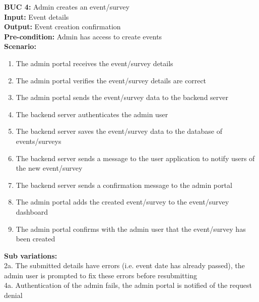 \documentclass[12pt]{article}
\begin{document}
\noindent\textbf{BUC 4: } Admin creates an event/survey \\
\textbf{Input:} Event details \\
\textbf{Output:} Event creation confirmation \\
\textbf{Pre-condition:} Admin has access to create events \\
\textbf{Scenario:} \\
\begin{enumerate}
  \item The admin portal receives the event/survey details
  \item The admin portal verifies the event/survey details are correct
  \item The admin portal sends the event/survey data to the backend server
  \item The backend server authenticates the admin user
  \item The backend server saves the event/survey data to the database of events/surveys
  \item The backend server sends a message to the user application to notify users of the new event/survey
  \item The backend server sends a confirmation message to the admin portal
  \item The admin portal adds the created event/survey to the event/survey dashboard
  \item The admin portal confirms with the admin user that the event/survey has been created
\end{enumerate}
\textbf{Sub variations:} \\
2a. The submitted details have errors (i.e. event date has already passed), the admin user is prompted to fix these errors before resubmitting \\
4a. Authentication of the admin fails, the admin portal is notified of the request denial \\
\end{document}

